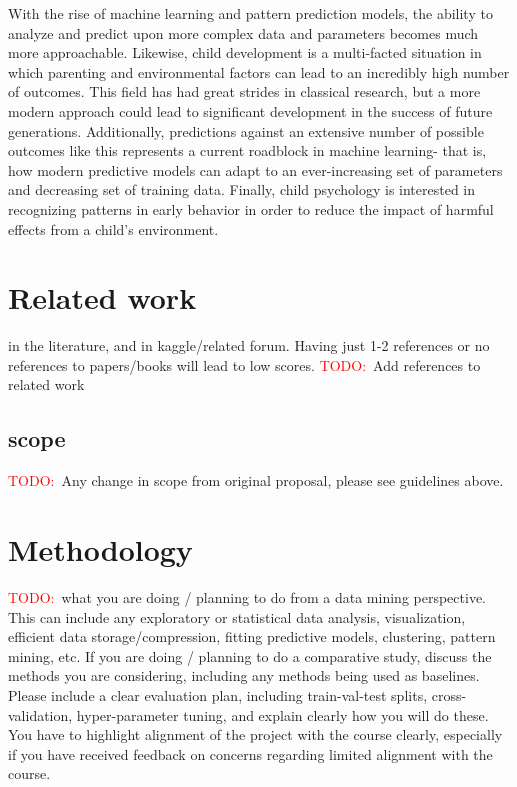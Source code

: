 \documentclass[11pt]{extarticle}
\newcommand{\todo}{\textcolor{red}{TODO:}~}
\begin{document}
\begin{mdframed}
    With the rise of machine learning and pattern prediction models, the ability to analyze and predict upon more complex data and parameters becomes much more approachable.
    Likewise, child development is a multi-facted situation in which parenting and environmental factors can lead to an incredibly high number of outcomes.
    This field has had great strides in classical research, but a more modern approach could lead to significant development in the success of future generations.
    Additionally, predictions against an extensive number of possible outcomes like this represents a current roadblock in machine learning- that is, how modern predictive models can adapt to an ever-increasing set of parameters and decreasing set of training data.
    Finally, child psychology is interested in recognizing patterns in early behavior in order to reduce the impact of harmful effects from a child's environment.
\end{mdframed}

\section{Related work} 
in the literature, and in kaggle/related forum. Having just 1-2 references or no references to papers/books will lead to low scores. 
\todo Add references to related work

\subsection{scope} 
\todo Any change in scope from original proposal, please see guidelines above. 

\section{Methodology} 
\todo what you are doing / planning to do from a data mining perspective. This can include any exploratory or statistical data analysis, visualization, efficient data storage/compression, fitting predictive models, clustering, pattern mining, etc.  If you are doing / planning to do a comparative study, discuss the methods you are considering, including any methods being used as baselines.  Please include a clear evaluation plan, including train-val-test splits, cross-validation, hyper-parameter tuning, and explain clearly how you will do these. You have to highlight alignment of the project with the course clearly, especially if you have received feedback on concerns regarding limited alignment with the course. 
\end{document}
